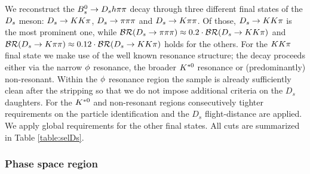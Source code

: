 We reconstruct the ${{B}^0_{s}}\rightarrow{\ensuremath{{D}_{s}}} h{\pi}{\pi}$ decay through three different final states of the ${{D}_{s}}$ meson: ${{D}_{s}}\rightarrow{\ensuremath{K}}{\ensuremath{K}}{\ensuremath{\pi}}$, ${{D}_{s}}\rightarrow{\ensuremath{\pi}}{\ensuremath{\pi}}{\ensuremath{\pi}}$ and ${{D}_{s}}\rightarrow{\ensuremath{K}}{\ensuremath{\pi}}{\ensuremath{\pi}}$.
Of those, ${{D}_{s}}\rightarrow{\ensuremath{K}}{\ensuremath{K}}{\ensuremath{\pi}}$ is the most prominent one,
while $\mathcal{BR}({{D}_{s}}\rightarrow{\ensuremath{\pi}}{\ensuremath{\pi}}{\ensuremath{\pi}}) \approx 0.2\cdot\mathcal{BR}({{D}_{s}}\rightarrow{\ensuremath{K}}{\ensuremath{K}}{\ensuremath{\pi}})$ and $\mathcal{BR}({{D}_{s}}\rightarrow{\ensuremath{K}}{\ensuremath{\pi}}{\ensuremath{\pi}}) \approx 0.12\cdot\mathcal{BR}({{D}_{s}}\rightarrow{\ensuremath{K}}{\ensuremath{K}}{\ensuremath{\pi}})$ holds for the others. 
For the ${K}{K}{\pi}$  final state we make use of the well known resonance structure;
the decay proceeds either via the narrow $\phi$ resonance, the broader ${{K}^{*0}}$ resonance or (predominantly) non-resonant.
Within the $\phi$ resonance region the sample is already sufficiently clean after the stripping so that we do not impose additional criteria on the $D_s$ daughters.
For the ${{K}^{*0}}$ and non-resonant regions consecutively tighter requirements on the particle identification and the $D_s$ flight-distance are applied. 
We apply global requirements for the other final states. All cuts are summarized in Table \ref{table:selDs}.


%
%
 
 \subsubsection{Phase space region}
 \label{ssec:phasespace}

